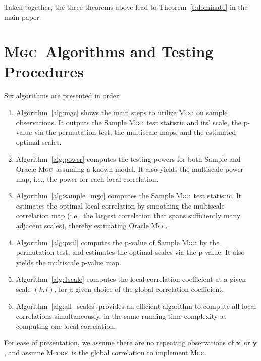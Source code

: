 \documentclass[11pt]{article}
\providecommand{\sct}[1]{{\normalfont\textsc{#1}}}
\providecommand{\mb}[1]{\boldsymbol{#1}}
\newcommand{\Mgc}{\sct{Mgc}}
\newcommand{\Mcorr}{\sct{Mcorr}}
\newcommand{\website}{\url{https://github.com/neurodata/MGC/}}
\newcommand{\mbx}{\ensuremath{\mb{x}}}
\newcommand{\mby}{\ensuremath{\mb{y}}}
\begin{document}
Taken together, the three theorems above lead to Theorem~\ref{t:dominate} in the main paper.


\clearpage

\section{\Mgc~Algorithms and Testing Procedures}
\label{appen:algorithms}




Six algorithms are presented in order:
\begin{enumerate}
\item Algorithm~\ref{alg:mgc} shows the main steps to utilize \Mgc~on sample observations. It outputs the Sample \Mgc~test statistic and its' scale, the p-value via the permutation test, the multiscale maps, and the estimated optimal scales.
\item Algorithm~\ref{alg:power} computes the testing powers for both Sample and Oracle \Mgc~assuming a known model. It also yields the multiscale power map, i.e., the power for each local correlation.
\item Algorithm~\ref{alg:sample_mgc} computes the Sample \Mgc~test statistic. It estimates the optimal local correlation by smoothing the multiscale correlation map (i.e., the largest correlation that spans sufficiently many adjacent scales), thereby estimating Oracle \Mgc.
\item Algorithm~\ref{alg:pval} computes the p-value of Sample \Mgc~by the permutation test, and estimates the optimal scales via the p-value. It also yields the multiscale p-value map. 
\item Algorithm~\ref{alg:1scale} computes the local correlation coefficient at a given scale $(k,l)$, for a given choice of the global correlation coefficient.
\item Algorithm~\ref{alg:all_scales} provides an efficient algorithm to compute all local correlations simultaneously, in the same running time complexity as computing one local correlation. 
\end{enumerate}
For ease of presentation, we assume there are no repeating observations of \mbx~or \mby, and assume \Mcorr~is the global correlation to implement \Mgc.
\end{document}

